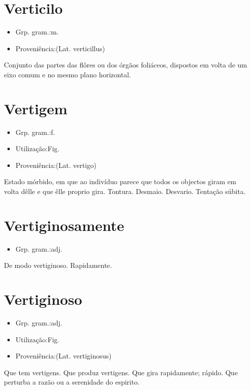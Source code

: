 \documentclass{article}
\begin{document}
\section{Verticilo}
\begin{itemize}
\item {Grp. gram.:m.}
\end{itemize}
\begin{itemize}
\item {Proveniência:(Lat. \textunderscore verticillus\textunderscore )}
\end{itemize}
Conjunto das partes das flôres ou dos órgãos foliáceos, dispostos em volta de um eixo comum e no mesmo plano horizontal.
\section{Vertigem}
\begin{itemize}
\item {Grp. gram.:f.}
\end{itemize}
\begin{itemize}
\item {Utilização:Fig.}
\end{itemize}
\begin{itemize}
\item {Proveniência:(Lat. \textunderscore vertigo\textunderscore )}
\end{itemize}
Estado mórbido, em que ao indivíduo parece que todos os objectos giram em volta dêlle e que êlle proprio gira.
Tontura.
Desmaio.
Desvario.
Tentação súbita.
\section{Vertiginosamente}
\begin{itemize}
\item {Grp. gram.:adj.}
\end{itemize}
De modo vertiginoso.
Rapidamente.
\section{Vertiginoso}
\begin{itemize}
\item {Grp. gram.:adj.}
\end{itemize}
\begin{itemize}
\item {Utilização:Fig.}
\end{itemize}
\begin{itemize}
\item {Proveniência:(Lat. \textunderscore vertiginosus\textunderscore )}
\end{itemize}
Que tem vertigens.
Que produz vertigens.
Que gira rapidamente; rápido.
Que perturba a razão ou a serenidade do espirito.
\end{document}
